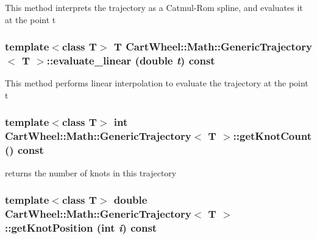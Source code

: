 \label{classCartWheel_1_1Math_1_1GenericTrajectory_a1ea20f4abe766ee96d5f4bf77dd2a837}
This method interprets the trajectory as a Catmul-\/Rom spline, and evaluates it at the point t \hypertarget{classCartWheel_1_1Math_1_1GenericTrajectory_ad46b4226d45dba8e9ade6da36719665d}{
\subsubsection[{evaluate\_\-linear}]{\setlength{\rightskip}{0pt plus 5cm}template$<$class T$>$ T {\bf CartWheel::Math::GenericTrajectory}$<$ T $>$::evaluate\_\-linear (double {\em t}) const}}
\label{classCartWheel_1_1Math_1_1GenericTrajectory_ad46b4226d45dba8e9ade6da36719665d}
This method performs linear interpolation to evaluate the trajectory at the point t \hypertarget{classCartWheel_1_1Math_1_1GenericTrajectory_abd4c9c7de6f886f35b2b7cfc3e19c0d1}{
\subsubsection[{getKnotCount}]{\setlength{\rightskip}{0pt plus 5cm}template$<$class T$>$ int {\bf CartWheel::Math::GenericTrajectory}$<$ T $>$::getKnotCount () const}}
\label{classCartWheel_1_1Math_1_1GenericTrajectory_abd4c9c7de6f886f35b2b7cfc3e19c0d1}
returns the number of knots in this trajectory \hypertarget{classCartWheel_1_1Math_1_1GenericTrajectory_a47285d1ca68a26683656aba3f8ddde9d}{
\subsubsection[{getKnotPosition}]{\setlength{\rightskip}{0pt plus 5cm}template$<$class T$>$ double {\bf CartWheel::Math::GenericTrajectory}$<$ T $>$::getKnotPosition (int {\em i}) const}}
